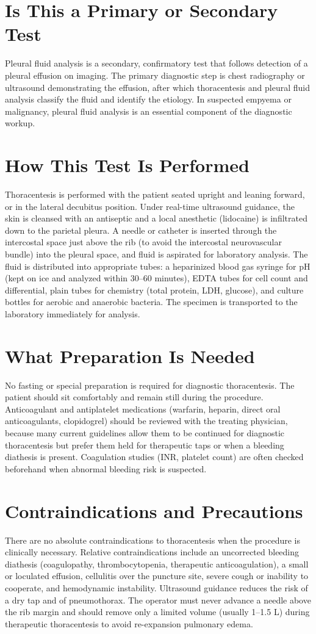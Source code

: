 \section*{Is This a Primary or Secondary Test}
Pleural fluid analysis is a secondary, confirmatory test that follows detection of a pleural effusion on imaging. The primary diagnostic step is chest radiography or ultrasound demonstrating the effusion, after which thoracentesis and pleural fluid analysis classify the fluid and identify the etiology. In suspected empyema or malignancy, pleural fluid analysis is an essential component of the diagnostic workup.
\section*{How This Test Is Performed}
Thoracentesis is performed with the patient seated upright and leaning forward, or in the lateral decubitus position. Under real-time ultrasound guidance, the skin is cleansed with an antiseptic and a local anesthetic (lidocaine) is infiltrated down to the parietal pleura. A needle or catheter is inserted through the intercostal space just above the rib (to avoid the intercostal neurovascular bundle) into the pleural space, and fluid is aspirated for laboratory analysis. The fluid is distributed into appropriate tubes: a heparinized blood gas syringe for pH (kept on ice and analyzed within 30--60 minutes), EDTA tubes for cell count and differential, plain tubes for chemistry (total protein, LDH, glucose), and culture bottles for aerobic and anaerobic bacteria. The specimen is transported to the laboratory immediately for analysis.
\section*{What Preparation Is Needed}
No fasting or special preparation is required for diagnostic thoracentesis. The patient should sit comfortably and remain still during the procedure. Anticoagulant and antiplatelet medications (warfarin, heparin, direct oral anticoagulants, clopidogrel) should be reviewed with the treating physician, because many current guidelines allow them to be continued for diagnostic thoracentesis but prefer them held for therapeutic taps or when a bleeding diathesis is present. Coagulation studies (INR, platelet count) are often checked beforehand when abnormal bleeding risk is suspected.
\section*{Contraindications and Precautions}
There are no absolute contraindications to thoracentesis when the procedure is clinically necessary. Relative contraindications include an uncorrected bleeding diathesis (coagulopathy, thrombocytopenia, therapeutic anticoagulation), a small or loculated effusion, cellulitis over the puncture site, severe cough or inability to cooperate, and hemodynamic instability. Ultrasound guidance reduces the risk of a dry tap and of pneumothorax. The operator must never advance a needle above the rib margin and should remove only a limited volume (usually 1--1.5 L) during therapeutic thoracentesis to avoid re-expansion pulmonary edema.
